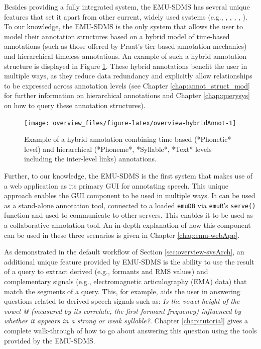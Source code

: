 \documentclass[]{book}
\begin{document}
Besides providing a fully integrated system, the EMU-SDMS has several unique features that set it apart from other current, widely used systems (e.g., \citet{boersma:2011a}, \citet{wittenburg:2006a}, \citet{fromont:2012a}, \citet{rose:2006a}, \citet{mcauliffe:2016a}). To our knowledge, the EMU-SDMS is the only system that allows the user to model their annotation structures based on a hybrid model of time-based annotations (such as those offered by Praat's tier-based annotation mechanics) and hierarchical timeless annotations. An example of such a hybrid annotation structure is displayed in Figure \ref{fig:overview-hybridAnnot}. These hybrid annotations benefit the user in multiple ways, as they reduce data redundancy and explicitly allow relationships to be expressed across annotation levels (see Chapter \ref{chap:annot_struct_mod} for further information on hierarchical annotations and Chapter \ref{chap:querysys} on how to query these annotation structures).

\begin{figure}

{\centering \texttt{[image: overview\_files/figure-latex/overview-hybridAnnot-1]} 

}

\caption{Example of a hybrid annotation combining time-based (*Phonetic* level) and hierarchical (*Phoneme*, *Syllable*, *Text* levels including the inter-level links) annotations.}\label{fig:overview-hybridAnnot}
\end{figure}

Further, to our knowledge, the EMU-SDMS is the first system that makes use of a web application as its primary GUI for annotating speech. This unique approach enables the GUI component to be used in multiple ways. It can be used as a stand-alone annotation tool, connected to a loaded \texttt{emuDB} via \texttt{emuR}'s \texttt{serve()} function and used to communicate to other servers. This enables it to be used as a collaborative annotation tool. An in-depth explanation of how this component can be used in these three scenarios is given in Chapter \ref{chap:emu-webApp}.

As demonstrated in the default workflow of Section \ref{sec:overview-sysArch}, an additional unique feature provided by EMU-SDMS is the ability to use the result of a query to extract derived (e.g., formants and RMS values) and complementary signals (e.g., electromagnetic articulography (EMA) data) that match the segments of a query. This, for example, aids the user in answering questions related to derived speech signals such as: \emph{Is the vowel height of the vowel @ (measured by its correlate, the first formant frequency) influenced by whether it appears in a strong or weak syllable?}. Chapter \ref{chap:tutorial} gives a complete walk-through of how to go about answering this question using the tools provided by the EMU-SDMS.
\end{document}
